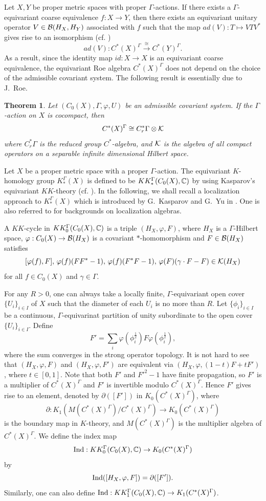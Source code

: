 \documentclass[11pt]{article}
\theoremstyle{definition}
\theoremstyle{plain}
\newtheorem{Thm}[Def]{Theorem}
\def\ind{\textup{Ind}}
\def\Ga{\Gamma}
\begin{document}
Let $X, Y$ be proper metric spaces with proper $\Gamma$-actions. If there exists a $\Gamma$-equivariant coarse equivalence $f:X\to Y$, then there exists an equivariant unitary operator $V\in\mathcal B(H_X,H_Y)$ associated with $f$ such that the map $ad(V): T\mapsto VTV^*$ gives rise to an isomorphism (cf. \cite{HIT2020})
$$ad(V):C^*(X)^{\Gamma}\xrightarrow{\cong} C^*(Y)^{\Gamma}.$$
As a result, since the identity map $id: X\to X$ is an equivariant coarse equivalence, the equivariant Roe algebra $C^*(X)^\Gamma$ does not depend on the choice of the admissible covariant system. The following result is essentially due to J.~Roe.

\begin{Thm}\label{Roe}
Let $(C_0(X), \Gamma, \varphi, U)$ be an admissible covariant system. If the $\Gamma$-action on $X$ is cocompact, then
$$C^*(X)^\Gamma\cong C^*_r\Gamma\otimes\mathcal K$$
where $C^*_r\Gamma$ is the reduced group $C^*$-algebra, and $\mathcal K$ is the algebra of all compact operators on a separable infinite dimensional Hilbert space.
\end{Thm}

Let $X$ be a proper metric space with a proper $\Ga$-action. The equivariant $K$-homology group $K_*^{\Ga}(X)$ is defined to be $KK^{\Ga}_*(C_0(X),\IC)$ by using Kasparov's equivariant $KK$-theory (cf. \cite{Kas88}). In the following, we shall recall a localization approach to $K^{\Ga}_*(X)$ which is introduced by G.~Kasparov and G.~Yu in \cite{KY2012}. One is also referred to \cite{Yu1997, QR2010, HIT2020} for backgrounds on localization algebras.

A $KK$-cycle in $KK^{\Ga}_0(C_0(X),\IC)$ is a triple $(H_X,\varphi,F)$, where $H_X$ is a $\Ga$-Hilbert space, $\varphi:C_0(X)\to\mathcal B(H_X)$ is a covariant $*$-homomorphism and $F\in\mathcal B(H_X)$ satisfies
$$[\varphi(f),F],\,\varphi(f)(FF^*-1),\,\varphi(f)(F^*F-1),\,\varphi(F)(\gamma\cdot F-F)\in\mathcal K(H_X)$$
for all $f\in C_0(X)$ and $\gamma\in\Ga$.

For any $R> 0$, one can always take a locally finite, $\Ga$-equivariant open cover $\{U_i\}_{i\in I}$ of $X$ such that the diameter of each $U_i$ is no more than $R$. Let $\{\phi_i\}_{i\in I}$ be a continuous, $\Ga$-equivarinat partition of unity subordinate to the open cover $\{U_i\}_{i\in I}$. Define
$$F'=\sum_{i}\varphi(\phi_i^{\frac 12})F\varphi(\phi_i^{\frac 12}),$$
where the sum converges in the strong operator topology. It is not hard to see that $(H_X,\varphi,F)$ and $(H_X,\varphi,F')$ are equivalent via $(H_X,\varphi,(1-t)F+tF')$, where $t\in[0,1]$. Note that both $F'$ and $F'^2-1$ have finite propagation, so $F'$ is a multiplier of $C^*(X)^{\Ga}$ and $F'$ is invertible modulo $C^*(X)^{\Ga}$. Hence $F'$ gives rise to an element, denoted by $\partial([F'])$ in $K_0(C^*(X)^{\Ga})$, where
$$\partial:K_1\left(M\left(C^*(X)^{\Ga}\right)/C^*(X)^{\Ga}\right)\to K_0\left(C^*(X)^{\Ga}\right)$$
is the boundary map in $K$-theory, and $M\left(C^*(X)^{\Ga}\right)$ is the multiplier algebra of $C^*(X)^{\Ga}$. We define the index map
$$\ind:KK^{\Ga}_0(C_0(X),\IC)\to K_0(C^*(X)^{\Ga})$$
by
$$\ind([H_X,\varphi,F])=\partial([F']).$$
Similarly, one can also define $\ind:KK^{\Ga}_1(C_0(X),\IC)\to K_1(C^*(X)^{\Ga})$.
\end{document}
